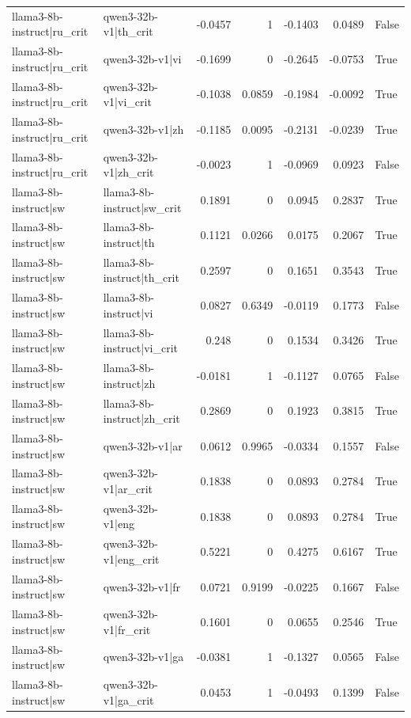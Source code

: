 \begin{table}
\begin{tabular}{l l r r r r l}
llama3-8b-instruct|ru_crit & qwen3-32b-v1|th_crit & -0.0457 & 1 & -0.1403 & 0.0489 & False \\
llama3-8b-instruct|ru_crit & qwen3-32b-v1|vi & -0.1699 & 0 & -0.2645 & -0.0753 & True \\
llama3-8b-instruct|ru_crit & qwen3-32b-v1|vi_crit & -0.1038 & 0.0859 & -0.1984 & -0.0092 & True \\
llama3-8b-instruct|ru_crit & qwen3-32b-v1|zh & -0.1185 & 0.0095 & -0.2131 & -0.0239 & True \\
llama3-8b-instruct|ru_crit & qwen3-32b-v1|zh_crit & -0.0023 & 1 & -0.0969 & 0.0923 & False \\
llama3-8b-instruct|sw & llama3-8b-instruct|sw_crit & 0.1891 & 0 & 0.0945 & 0.2837 & True \\
llama3-8b-instruct|sw & llama3-8b-instruct|th & 0.1121 & 0.0266 & 0.0175 & 0.2067 & True \\
llama3-8b-instruct|sw & llama3-8b-instruct|th_crit & 0.2597 & 0 & 0.1651 & 0.3543 & True \\
llama3-8b-instruct|sw & llama3-8b-instruct|vi & 0.0827 & 0.6349 & -0.0119 & 0.1773 & False \\
llama3-8b-instruct|sw & llama3-8b-instruct|vi_crit & 0.248 & 0 & 0.1534 & 0.3426 & True \\
llama3-8b-instruct|sw & llama3-8b-instruct|zh & -0.0181 & 1 & -0.1127 & 0.0765 & False \\
llama3-8b-instruct|sw & llama3-8b-instruct|zh_crit & 0.2869 & 0 & 0.1923 & 0.3815 & True \\
llama3-8b-instruct|sw & qwen3-32b-v1|ar & 0.0612 & 0.9965 & -0.0334 & 0.1557 & False \\
llama3-8b-instruct|sw & qwen3-32b-v1|ar_crit & 0.1838 & 0 & 0.0893 & 0.2784 & True \\
llama3-8b-instruct|sw & qwen3-32b-v1|eng & 0.1838 & 0 & 0.0893 & 0.2784 & True \\
llama3-8b-instruct|sw & qwen3-32b-v1|eng_crit & 0.5221 & 0 & 0.4275 & 0.6167 & True \\
llama3-8b-instruct|sw & qwen3-32b-v1|fr & 0.0721 & 0.9199 & -0.0225 & 0.1667 & False \\
llama3-8b-instruct|sw & qwen3-32b-v1|fr_crit & 0.1601 & 0 & 0.0655 & 0.2546 & True \\
llama3-8b-instruct|sw & qwen3-32b-v1|ga & -0.0381 & 1 & -0.1327 & 0.0565 & False \\
llama3-8b-instruct|sw & qwen3-32b-v1|ga_crit & 0.0453 & 1 & -0.0493 & 0.1399 & False \\

\end{tabular}
\end{table}
